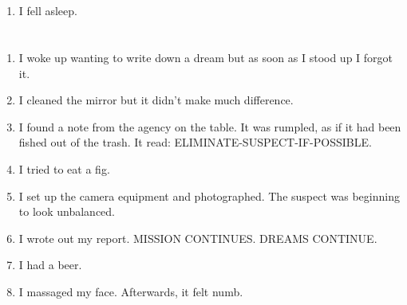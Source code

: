 \documentclass{article}
\begin{document}
    \newpage
    
    \section{}
    
    \begin{enumerate}
    
    \item I fell asleep.\\
    
    \end{enumerate}
     
    \newpage
    
    \section{}
    
    \begin{enumerate}
    
    \item I woke up wanting to write down a dream but as soon as I stood up I forgot it.\\
    
    \item I cleaned the mirror but it didn't make much difference.\\
    
    \item I found a note from the agency on the table. It was rumpled, as if it had been fished out of the trash. It read: ELIMINATE-SUSPECT-IF-POSSIBLE.\\
    
    \item I tried to eat a fig.\\
    
    \item I set up the camera equipment and photographed. The suspect was beginning to look unbalanced.\\
    
    \item I wrote out my report. MISSION CONTINUES. DREAMS CONTINUE.\\
    
    \item I had a beer.\\
    
    \item I massaged my face. Afterwards, it felt numb.\\
    
    \end{enumerate}
     
\end{document}
